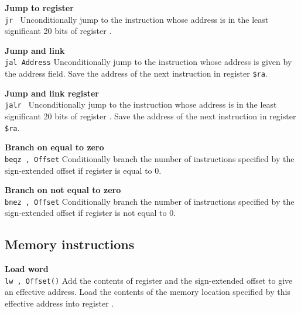 \noindent
{\bf Jump to register}\\
\noindent
\texttt{jr \regs}
Unconditionally jump to the instruction whose
address is in the least significant 20 bits of register \regs{}.
\vspace{3ex}

\noindent
{\bf Jump and link}\\
\noindent
\texttt{jal Address}
Unconditionally jump to the instruction whose address is given by the address field.
Save the address of the next instruction in register \texttt{\$ra}.
\vspace{3ex}
\newpage

\noindent
{\bf Jump and link register}\\
\noindent
\texttt{jalr \regs}
Unconditionally jump to the instruction whose
address is in the least significant 20 bits of register \regs{}.
Save the address of the next instruction in register \texttt{\$ra}.
\vspace{3ex}

\noindent
{\bf Branch on equal to zero}\\
\noindent
\texttt{beqz \regs, Offset}
Conditionally branch the number of instructions specified by the
sign-extended offset if register \regs{} is equal to 0.
\vspace{3ex}

\noindent
{\bf Branch on not equal to zero}\\
\noindent
\texttt{bnez \regs, Offset}
Conditionally branch the number of instructions specified by the
sign-extended offset if register \regs{} is not equal to 0.
\vspace{3ex}

\subsection{Memory instructions}

\noindent
{\bf Load word}\\
\noindent
\texttt{lw \regd, Offset(\regs{})}
Add the contents of register \regs{} and the sign-extended offset to
give an effective address. Load the contents of the memory location
specified by this effective address into register \regd{}.
\vspace{3ex}

